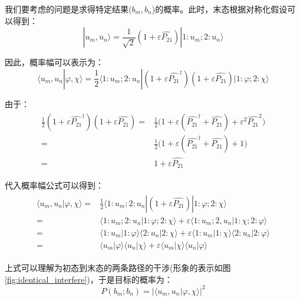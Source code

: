\begin{remark}
        我们要考虑的问题是求得特定结果($b_m,b_n$)的概率。此时，末态根据对称化假设可以得到：
        \begin{equation}
            |u_m,u_n\rangle=\frac{1}{\sqrt{2}}(1+\varepsilon\hat{P_{21}})|1:u_m;2:u_n\rangle
        \end{equation}
        
        因此，概率幅可以表示为：
        \begin{equation}
            \langle u_m,u_n|\varphi,\chi\rangle=\frac{1}{2}\langle 1:u_m;2:u_n|(1+\varepsilon\hat{P_{21}}^\dagger)(1+\varepsilon\hat{P_{21}})|1:\varphi;2:\chi\rangle
        \end{equation}
        
        由于：
        \begin{align}
            \begin{split}
                \frac{1}{2}(1+\varepsilon\hat{P_{21}}^\dagger)(1+\varepsilon\hat{P_{21}})=&\frac{1}{2}\big(1+\varepsilon(\hat{P_{21}}^\dagger+\hat{P_{21}})+\varepsilon^2\hat{P_{21}}^2\big)\\
                =&\frac{1}{2}\big(1+\varepsilon(\hat{P_{21}}^\dagger+\hat{P_{21}})+1\big)\\
                =&1+\varepsilon \hat{P_{21}}
            \end{split}
        \end{align}
        
        代入概率幅公式可以得到：
        \begin{align}
            \begin{split}
                 \langle u_m,u_n|\varphi,\chi\rangle=&\frac{1}{2}\langle 1:u_m;2:u_n|(1+\varepsilon\hat{P_{21}})|1:\varphi;2:\chi\rangle\\
                 =&\langle 1:u_m;2:u_n|1:\varphi;2:\chi\rangle+\varepsilon\langle 1:u_m;2,u_n|1:\chi;2:\varphi\rangle\\
                 =&\langle 1:u_m|1:\varphi\rangle\langle 2:u_n|2:\chi\rangle+\varepsilon\langle 1:u_m|1:\chi\rangle\langle2:u_n|2:\varphi\rangle\\
                 =& \langle u_m|\varphi\rangle\langle u_n|\chi\rangle+\varepsilon\langle u_m|\chi\rangle\langle u_n|\varphi\rangle
            \end{split}
        \end{align}
        
        上式可以理解为初态到末态的两条路径的干涉(形象的表示如图\eqref{fig:identical_interfere})，于是目标的概率为：
        \begin{equation}
            P(b_m;b_n)=| \langle u_m,u_n|\varphi,\chi\rangle|^2
        \end{equation}
        

\end{remark}
